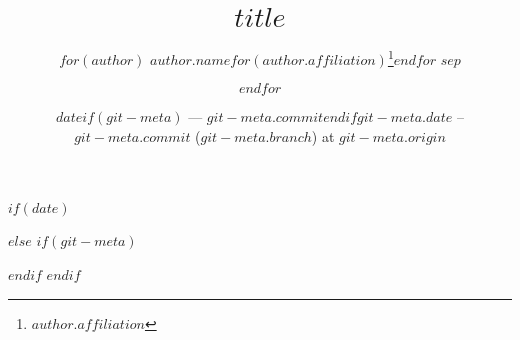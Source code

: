 %

\title{$title$}
\author{%
    $for(author)$
    $author.name$$for(author.affiliation)$\thanks{$author.affiliation$}$endfor$
    $sep$ \and
    $endfor$
}

$if(date)$
\date{$date$$if(git-meta)$ --- $git-meta.commit$$endif$}
$else$
$if(git-meta)$
\date{$git-meta.date$ -- $git-meta.commit$ ($git-meta.branch$) at $git-meta.origin$}
$endif$
$endif$

\newcommand{\makeabstract}{
\begin{abstract}
$if(abstract)$
    $abstract$
$else$
    Please write an abstract in the \texttt{paper-meta.yaml} file.
$endif$
\end{abstract}
}
